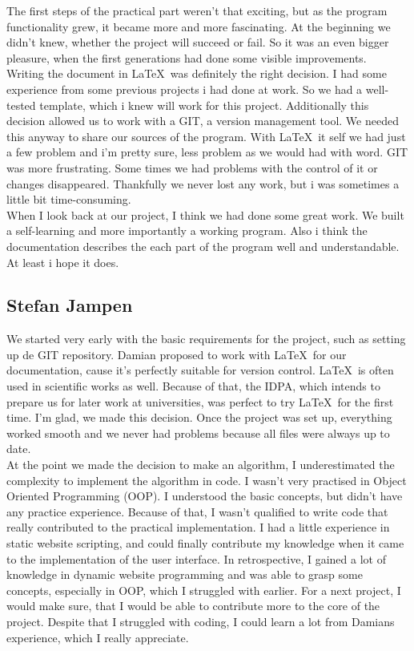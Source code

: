 The first steps of the practical part weren't that exciting, but as the program functionality grew, it became more and more fascinating. At the beginning we didn't knew, whether the project will succeed or fail. So it was an even bigger pleasure, when the first generations had done some visible improvements. \\

Writing the document in \LaTeX\ was definitely the right decision. I had some experience from some previous projects i had done at work. So we had a well-tested template, which i knew will work for this project. Additionally this decision allowed us to work with a GIT, a version management tool. We needed this anyway to share our sources of the program. With \LaTeX\ it self we had just a few problem and i'm pretty sure, less problem as we would had with word. GIT was more frustrating. Some times we had problems with the control of it or changes disappeared. Thankfully we never lost any work, but i was sometimes a little bit time-consuming.\\

When I look back at our project, I think we had done some great work. We built a self-learning and more importantly a working program. Also i think the documentation describes the each part of the program well and understandable. At least i hope it does.

\subsection{Stefan Jampen}
We started very early with the basic requirements for the project, such as setting up de GIT repository.
Damian proposed to work with \LaTeX\ for our documentation, cause it's perfectly suitable for version control. \LaTeX\ is often used in scientific works as well. Because of that, the IDPA, which intends to prepare us for later work at universities, was perfect to try LaTeX\ for the first time. I'm glad, we made this decision. Once the project was set up, everything worked smooth and we never had problems because all files were always up to date.\\

At the point we made the decision to make an algorithm, I underestimated the complexity to implement the algorithm in code. I wasn't very practised in Object Oriented Programming (OOP). I understood the basic concepts, but didn't have any practice experience. Because of that, I wasn't qualified to write code that really contributed to the practical implementation.
I had a little experience in static website scripting, and could finally contribute my knowledge when it came to the implementation of the user interface. In retrospective, I gained a lot of knowledge in dynamic website programming and was able to grasp some concepts, especially in OOP, which I struggled with earlier. 
For a next project, I would make sure, that I would be able to contribute more to the core of the project.
Despite that I struggled with coding, I could learn a lot from Damians experience, which I really appreciate.\\

